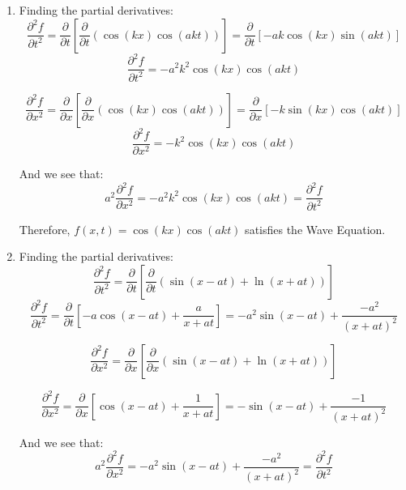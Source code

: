 \begin{Answer}[ref = wave]
\begin{enumerate}
    \item Finding the partial derivatives:
    $$\frac{\partial^2 f}{\partial t^2} = \frac{\partial}{\partial t} \left[ 
    \frac{\partial}{\partial t} \left( \cos{ \left( k x \right)} \cos{ \left( 
    a k t \right)} \right) \right] = \frac{\partial}{\partial t} \left[ -a k 
    \cos{ \left( k x \right)} \sin{ \left( a k t \right)} \right]$$
    $$\frac{\partial^2 f}{\partial t^2} = -a^2 k^2 \cos{ \left( k x \right)} 
    \cos{ \left( a k t \right)}$$

    $$\frac{\partial^2 f}{\partial x^2} = \frac{\partial}{\partial x} \left[ 
    \frac{\partial}{\partial x} \left( \cos{\left( k x \right)}\cos{\left( a k 
    t \right)} \right) \right] = \frac{\partial}{\partial x} \left[ -k \sin{ 
    \left( k x \right)} \cos{ \left( a k t \right)} \right]$$
    $$\frac{\partial^2 f}{\partial x^2} = -k^2 \cos{ \left( k x \right)} \cos{ 
    \left( a k t \right)}$$

    And we see that:
    $$a^2 \frac{\partial^2 f}{\partial x^2} = -a^2 k^2 \cos{ \left( k x 
    \right)} \cos{ \left( a k t \right)} = \frac{\partial^2 f}{\partial t^2}$$

    Therefore, $f(x, t) = \cos{\left( k x \right)}\cos{\left( a k t \right)}$ 
    satisfies the Wave Equation. 

    \item Finding the partial derivatives:
    $$\frac{\partial^2 f}{\partial t^2} = \frac{\partial}{\partial t} \left[ 
    \frac{\partial}{\partial t} \left( \sin{\left( x - a t \right)} + \ln{ 
    \left( x + a t \right)} \right) \right]$$
    $$\frac{\partial^2 f}{\partial t^2} = \frac{\partial}{\partial t} \left[ 
    -a \cos{ \left( x - a t \right)} + \frac{a}{x + a t} \right] = -a^2 \sin{ 
    \left( x - a t \right)} + \frac{-a^2}{\left( x + a t \right)^2}$$

    $$\frac{\partial^2 f}{\partial x^2} = \frac{\partial}{\partial x} \left[ 
    \frac{\partial}{\partial x} \left( \sin{ \left( x - a t \right)} + \ln{ 
    \left( x + a t \right)} \right) \right]$$

    $$\frac{\partial^2 f}{\partial x^2} = \frac{\partial}{\partial x} \left[ 
    \cos{ \left( x - a t \right)} + \frac{1}{x + a t} \right] = -\sin{ \left( 
    x - a t \right)} + \frac{-1}{\left( x + a t \right)^2}$$

    And we see that:
    $$a^2 \frac{\partial^2 f}{\partial x^2} = -a^2 \sin{ \left( x - a t 
    \right)} + \frac{-a^2}{\left( x + a t \right)^2} = \frac{\partial^2 f}{
    \partial t^2}$$


\end{enumerate}
\end{Answer}
